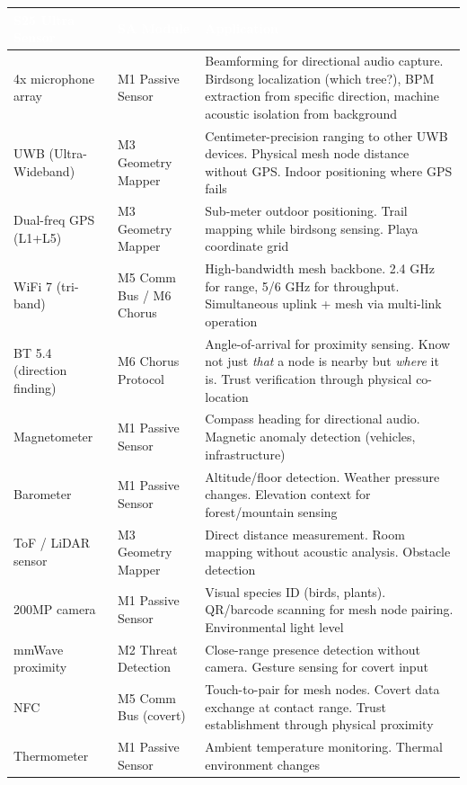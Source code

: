 \documentclass[11pt,letterpaper]{article}
\newcommand{\tableheader}[1]{\textbf{\sffamily\textcolor{white}{#1}}}
\begin{document}
\begin{center}
\begin{tabularx}{\textwidth}{L{3.5cm}L{3cm}X}
\toprule
{}
\tableheader{S25 Ultra Sensor} & \tableheader{SA Module} & \tableheader{Application} \\
\midrule
4x microphone array & M1 Passive Sensor & Beamforming for directional audio capture. Birdsong localization (which tree?), BPM extraction from specific direction, machine acoustic isolation from background \\
UWB (Ultra-Wideband) & M3 Geometry Mapper & Centimeter-precision ranging to other UWB devices. Physical mesh node distance without GPS. Indoor positioning where GPS fails \\
Dual-freq GPS (L1+L5) & M3 Geometry Mapper & Sub-meter outdoor positioning. Trail mapping while birdsong sensing. Playa coordinate grid \\
WiFi 7 (tri-band) & M5 Comm Bus / M6 Chorus & High-bandwidth mesh backbone. 2.4 GHz for range, 5/6 GHz for throughput. Simultaneous uplink + mesh via multi-link operation \\
BT 5.4 (direction finding) & M6 Chorus Protocol & Angle-of-arrival for proximity sensing. Know not just \textit{that} a node is nearby but \textit{where} it is. Trust verification through physical co-location \\
Magnetometer & M1 Passive Sensor & Compass heading for directional audio. Magnetic anomaly detection (vehicles, infrastructure) \\
Barometer & M1 Passive Sensor & Altitude/floor detection. Weather pressure changes. Elevation context for forest/mountain sensing \\
ToF / LiDAR sensor & M3 Geometry Mapper & Direct distance measurement. Room mapping without acoustic analysis. Obstacle detection \\
200MP camera & M1 Passive Sensor & Visual species ID (birds, plants). QR/barcode scanning for mesh node pairing. Environmental light level \\
mmWave proximity & M2 Threat Detection & Close-range presence detection without camera. Gesture sensing for covert input \\
NFC & M5 Comm Bus (covert) & Touch-to-pair for mesh nodes. Covert data exchange at contact range. Trust establishment through physical proximity \\
Thermometer & M1 Passive Sensor & Ambient temperature monitoring. Thermal environment changes \\
\bottomrule
\end{tabularx}
\end{center}
\end{document}
